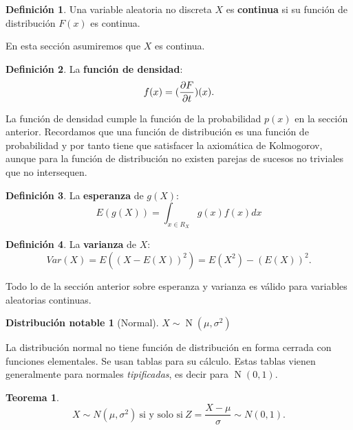 \documentclass{article}
\newtheorem{theorem}{Teorema}
\theoremstyle{definition}
\newtheorem{define}{Definición}
\newtheorem{distr}{Distribución notable}
\theoremstyle{remark}
\DeclareMathOperator{\normal}{N}
\begin{document}
\begin{define}
	Una variable aleatoria no discreta $X$ es \textbf{continua} si su función de distribución $F(x)$ es continua.
\end{define}

En esta sección asumiremos que $X$ es continua.

\begin{define}
	La \textbf{función de densidad}:
	\begin{equation*}
		f(x) = (\pdv{F}{t})(x).
	\end{equation*}
\end{define}

La función de densidad cumple la función de la probabilidad $p(x)$ en la sección anterior. Recordamos que una función de distribución es una función de probabilidad y por tanto tiene que satisfacer la axiomática de Kolmogorov, aunque para la función de distribución no existen parejas de sucesos no triviales que no intersequen.

\begin{define}
	La \textbf{esperanza} de $g(X)$:
	\begin{equation*}
		E(g(X)) = \int_{x \in R_X} g(x)f(x) dx
	\end{equation*}
\end{define}

\begin{define}
	La \textbf{varianza} de $X$:
	\begin{equation*}
		Var(X) = E((X - E(X))^2) = E(X^2) - (E(X))^2.
	\end{equation*}
\end{define}

Todo lo de la sección anterior sobre esperanza y varianza es válido para variables aleatorias continuas.

\begin{distr}[Normal]
	$X \sim \normal(\mu, \sigma^2)$
\end{distr}

La distribución normal no tiene función de distribución en forma cerrada con funciones elementales. Se usan tablas para su cálculo. Estas tablas vienen generalmente para normales \textit{tipificadas}, es decir para $\normal(0, 1)$.

\begin{theorem}
	\begin{equation*}
		X \sim N(\mu, \sigma^2)\ \text{si y solo si}\ Z = \frac{X - \mu}{\sigma} \sim N(0, 1).
	\end{equation*}
\end{theorem}
\end{document}
